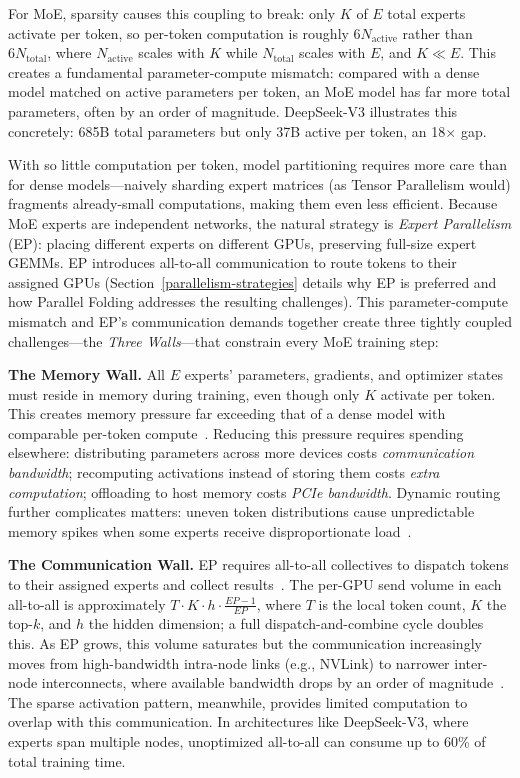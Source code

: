 For MoE, sparsity causes this coupling to break: only $K$ of $E$ total experts activate per token, so per-token computation is roughly $6 N_{\text{active}}$ rather than $6 N_{\text{total}}$, where $N_{\text{active}}$ scales with $K$ while $N_{\text{total}}$ scales with $E$, and $K \ll E$. This creates a fundamental parameter-compute mismatch: compared with a dense model matched on active parameters per token, an MoE model has far more total parameters, often by an order of magnitude. DeepSeek-V3 illustrates this concretely: 685B total parameters but only 37B active per token, an 18$\times$ gap.

With so little computation per token, model partitioning requires more care than for dense models---naively sharding expert matrices (as Tensor Parallelism would) fragments already-small computations, making them even less efficient. Because MoE experts are independent networks, the natural strategy is \emph{Expert Parallelism} (EP): placing different experts on different GPUs, preserving full-size expert GEMMs. EP introduces all-to-all communication to route tokens to their assigned GPUs (Section~\ref{parallelism-strategies} details why EP is preferred and how Parallel Folding addresses the resulting challenges). This parameter-compute mismatch and EP's communication demands together create three tightly coupled challenges---the \emph{Three Walls}---that constrain every MoE training step:

\textbf{The Memory Wall.} All $E$ experts' parameters, gradients, and optimizer states must reside in memory during training, even though only $K$ activate per token. This creates memory pressure far exceeding that of a dense model with comparable per-token compute~\cite{fedus2022switchtransformersscalingtrillion,Cai_2025}. Reducing this pressure requires spending elsewhere: distributing parameters across more devices costs \emph{communication bandwidth}; recomputing activations instead of storing them costs \emph{extra computation}; offloading to host memory costs \emph{PCIe bandwidth}. Dynamic routing further complicates matters: uneven token distributions cause unpredictable memory spikes when some experts receive disproportionate load~\cite{lepikhin2020gshard,wang2024auxiliarylossfreeloadbalancingstrategy}.

\textbf{The Communication Wall.} EP requires all-to-all collectives to dispatch tokens to their assigned experts and collect results~\cite{lepikhin2020gshard}. The per-GPU send volume in each all-to-all is approximately $T \cdot K \cdot h \cdot \frac{EP-1}{EP}$, where $T$ is the local token count, $K$ the top-$k$, and $h$ the hidden dimension; a full dispatch-and-combine cycle doubles this. As EP grows, this volume saturates but the communication increasingly moves from high-bandwidth intra-node links (e.g., NVLink) to narrower inter-node interconnects, where available bandwidth drops by an order of magnitude~\cite{deepep2025}. The sparse activation pattern, meanwhile, provides limited computation to overlap with this communication. In architectures like DeepSeek-V3, where experts span multiple nodes, unoptimized all-to-all can consume up to 60\% of total training time.

